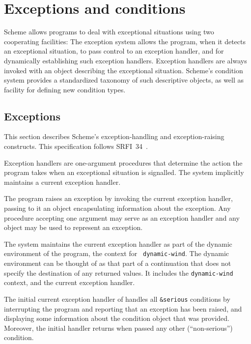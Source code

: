 \chapter{Exceptions and conditions}
\label{exceptionsconditions}

Scheme allows programs to deal with exceptional situations using two
cooperating facilities: The exception system allows the program, when
it detects an exceptional situation, to pass control to an exception
handler, and for dynamically establishing such exception handlers.
Exception handlers are always invoked with an object describing the
exceptional situation.  Scheme's condition system provides a
standardized taxonomy of such descriptive objects, as well as facility
for defining new condition types.

\section{Exceptions}


This section describes Scheme's exception-handling and
exception-raising constructs.  This specification follows
SRFI~34~\cite{srfi34}.

Exception handlers are one-argument procedures that determine the
action the program takes when an exceptional situation is signalled.
The system implicitly maintains a current exception handler.

The program raises an exception
by invoking the current exception handler, passing to it an object
encapsulating information about the exception. Any procedure accepting
one argument may serve as an exception handler and any object may be
used to represent an exception.

The system maintains the current exception handler as part of the
dynamic environment of the program, the context for {\tt
  dynamic-wind}. The dynamic environment can be thought of as that
part of a continuation that does not specify the destination of any
returned values. It includes the {\tt dynamic-wind} context, and the
current exception handler.

The initial current exception handler of handles all {\tt \&serious}
conditions by interrupting the program and reporting that an exception
has been raised, and displaying some information about the condition
object that was provided.  Moreover, the initial handler
returns when passed any other (``non-serious'') condition.

